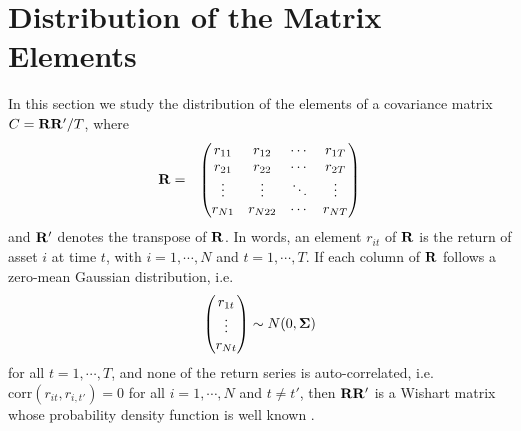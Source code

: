 \section{Distribution of the Matrix Elements}
\label{sec:GCC-analytical}
In this section we study the distribution of the elements of a
covariance matrix $C = \mathbf{RR'}/T$, where
\begin{eqnarray*}
  \mathbf{R} &=&
  \begin{pmatrix}
    r_{11} & r_{12} & \cdots & r_{1T} \\
    r_{21} & r_{22} & \cdots & r_{2T} \\
    \vdots & \vdots & \ddots & \vdots \\
    r_{N1} & r_{N22} & \cdots & r_{NT} \\
  \end{pmatrix}
\end{eqnarray*}
and $\mathbf{R}'$ denotes the transpose of $\mathbf{R}$.
In words, an element $r_{it}$ of $\mathbf{R}$ is the return of asset $i$
at time $t$, with $i=1,\cdots, N$ and $t = 1, \cdots, T$. If each
column of $\mathbf{R}$ follows a zero-mean Gaussian distribution, i.e.
\begin{eqnarray*}
  \begin{pmatrix}
    r_{1t} \\
    \vdots \\
    r_{Nt}
  \end{pmatrix} \sim N(0, \mathbf{\Sigma})
\end{eqnarray*}
for all $t = 1, \cdots, T$, and none of the return series is
auto-correlated, i.e. $\text{corr}(r_{it}, r_{i,t'}) = 0$ for all $i =
1, \cdots, N$ and $t \neq t'$, then $\mathbf{RR'}$ is a Wishart matrix whose
probability density function is well known \cite{Anderson2003}.

